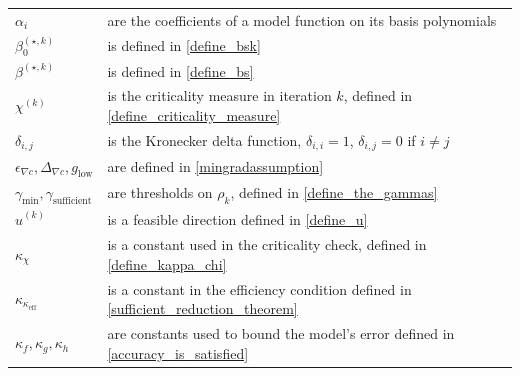 \documentclass{article}
\theoremstyle{case}
\numberwithin{theorem}{subsection}
\newcommand{\bs}{{\beta^{(\star, k)}}}
\newcommand{\bsk}{{\beta_0^{(\star, k)}}}
\newcommand{\chik}{{\chi^{(k)}}}
\newcommand{\gammabi}{\gamma_{\textrm{sufficient}}}
\newcommand{\gammasm}{\gamma_{\textrm{min}}}
\newcommand{\huk}{{{\hat u}^{(k)}}}
\newcommand{\kappacrit}{{\kappa_{\textrm{eff}}}}
\newcommand{\mingraddelta}{{\Delta_{\nabla c}}}
\newcommand{\mingradepsilon}{{\epsilon_{\nabla c}}}
\newcommand{\mingrad}{{ g_{\textrm{low}} }}
\newcommand{\rk}{\rho_k}
\begin{document}
\begin{longtable}{| p{} | p{} |}
$\alpha_i$ & are the coefficients of a model function on its basis polynomials \\ %
$\bsk $ & is defined in \cref{define_bsk} \\ %
$\bs $ & is defined in \cref{define_bs} \\ %
$\chik$ & is the criticality measure in iteration $k$, defined in \cref{define_criticality_measure} \\ %
$\delta_{i,j}$ & is the Kronecker delta function, $\delta_{i,i} = 1$, $\delta_{i,j} = 0$ if $i\ne j$ \\ %
$\mingradepsilon, \mingraddelta, \mingrad$ & are defined in \cref{mingradassumption} \\ %
$\gammasm,\gammabi$ & are thresholds on $\rk$, defined in \cref{define_the_gammas} \\ %
$\huk$ & is a feasible direction defined in \cref{define_u} \\ %
$\kappa_{\chi}$ & is a constant used in the criticality check, defined in \cref{define_kappa_chi} \\ %
$\kappa_{\kappacrit}$ & is a constant in the efficiency condition defined in \cref{sufficient_reduction_theorem} \\ %
$\kappa_{f},\kappa_{g},\kappa_{h}$ & are constants used to bound the model's error defined in \cref{accuracy_is_satisfied} \\ %

\end{longtable}
\end{document}
